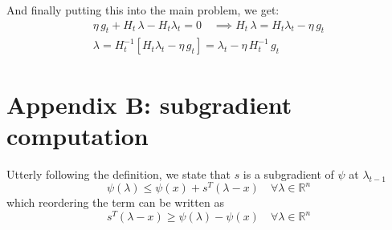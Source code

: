 \documentclass[notitlepage]{article}
\begin{document}
And finally putting this into the main problem, we get:
\begin{align*}
  \eta\, g_t + H_t\, \lambda - H_t \lambda_t = 0 \quad \implies H_t\, \lambda = H_t \lambda_t - \eta\, g_t \\
  \lambda = H_t^{-1} \left[ H_t \lambda_t - \eta\, g_t \right] = \lambda_t - \eta\, H_t^{-1}\, g_t
\end{align*}


\section{Appendix B: subgradient computation}

Utterly following the definition, we state that $s$ is a subgradient of $\psi$ at $\lambda_{t-1}$
\[
  \psi( \lambda ) \le \psi(x) + s^T (\lambda - x) \quad \forall \lambda \in \mathbb{R}^n  
\]
which reordering the term can be written as
\[
  s^T (\lambda - x) \ge \psi(\lambda) - \psi(x) \quad \forall \lambda \in \mathbb{R}^n  
\]
\end{document}
